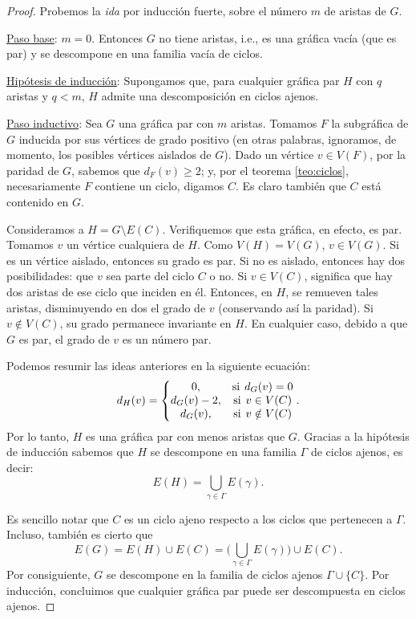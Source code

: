 \begin{proof}
Probemos la \textit{ida} por inducción fuerte, sobre el número $m$ de aristas de $G$. 

\underline{Paso base}: $m=0$. Entonces $G$ no tiene aristas, i.e., es una gráfica vacía (que es par) y se descompone en una familia vacía de ciclos.

\underline{Hipótesis de inducción}: Supongamos que, para cualquier gráfica par $H$ con $q$ aristas y $q < m$, $H$ admite una descomposición en ciclos ajenos.

\underline{Paso inductivo}: Sea $G$ una gráfica par con $m$ aristas. Tomamos $F$ la subgráfica de $G$ inducida por sus vértices de grado positivo (en otras palabras, ignoramos, de momento, los posibles vértices aislados de $G$). Dado un vértice $v \in V(F)$, por la paridad de $G$, sabemos que $d_{F}(v)\geq 2$; y, por el teorema \ref{teo:ciclos}, necesariamente $F$ contiene un ciclo, digamos $C$. Es claro también que $C$ está contenido en $G$.

Consideramos a $H = G \setminus E(C)$. Verifiquemos que esta gráfica, en efecto, es par. Tomamos $v$ un vértice cualquiera de $H$. Como $V(H) = V(G)$, $v \in V(G)$. Si es un vértice aislado, entonces su grado es par. Si no es aislado, entonces hay dos posibilidades: que $v$ sea parte del ciclo $C$ o no. Si $v \in V(C)$, significa que hay dos aristas de ese ciclo que inciden en él. Entonces, en $H$, se remueven tales aristas, disminuyendo en dos el grado de $v$ (conservando así la paridad). Si $v \notin V(C)$, su grado permanece invariante en $H$. En cualquier caso, debido a que $G$ es par, el grado de $v$ es un número par. 

Podemos resumir las ideas anteriores en la siguiente ecuación:
$$
  d_{H}(v) = \left\{\begin{matrix}
0, & \text{si} \hspace{1.5mm} d_{G}(v)=0 \\ 
d_{G}(v)-2, & \text{si} \hspace{1.5mm} v \in V(C)     \\
d_{G}(v), & \text{si} \hspace{1.5mm} v \notin V(C)
\end{matrix}\right..
$$
Por lo tanto, $H$ es una gráfica par con menos aristas que $G$. Gracias a la hipótesis de inducción sabemos que $H$ se descompone en una familia $\Gamma$ de ciclos ajenos, es decir:
$$
E(H) = \bigcup_{\gamma \in \Gamma} E(\gamma).
$$

Es sencillo notar que $C$ es un ciclo ajeno respecto a los ciclos que pertenecen a $\Gamma$. Incluso, también es cierto que 
$$
E(G) = E(H) \cup E(C) = \big( \bigcup_{\gamma \in \Gamma} E(\gamma) \big) \cup E(C). 
$$
Por consiguiente, $G$ se descompone en la familia de ciclos ajenos $\Gamma \cup \{C\}$. Por inducción, concluimos que cualquier gráfica par puede ser descompuesta en ciclos ajenos.


\end{proof}
